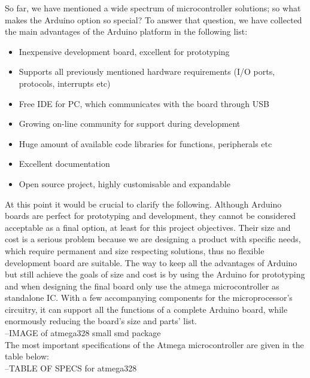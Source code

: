 So far, we have mentioned a wide spectrum of microcontroller solutions; so what makes the Arduino option so special? To answer that question, we have collected the main advantages of the Arduino platform in the following list:

\begin{itemize}
    \item Inexpensive development board, excellent for prototyping
    \item Supports all previously mentioned hardware requirements (I/O ports, protocols, interrupts etc)
    \item Free IDE for PC, which communicates with the board through USB
    \item Growing on-line community for support during development
    \item Huge amount of available code libraries for functions, peripherals etc
    \item Excellent documentation
    \item Open source project, highly customisable and expandable
\end{itemize}

At this point it would be crucial to clarify the following. Although Arduino boards are perfect for prototyping and development, they cannot be considered acceptable as a final option, at least for this project objectives. Their size and cost is a serious problem because we are designing a product with specific needs, which require permanent and size respecting solutions, thus no flexible development board are suitable. The way to keep all the advantages of Arduino but still achieve the goals of size and cost is by using the Arduino for prototyping and when designing the final board only use the atmega microcontroller as standalone IC. With a few accompanying components for the microprocessor's circuitry, it can support all the functions of a complete Arduino board, while enormously reducing the board's size and parts' list.\\

--IMAGE of atmega328 small smd package\\

The most important specifications of the Atmega microcontroller are given in the table below:\\

--TABLE OF SPECS for atmega328\\

